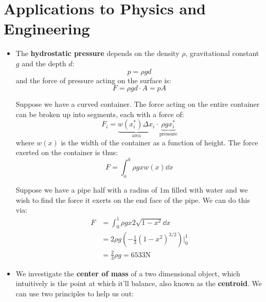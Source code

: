 \section{Applications to Physics and Engineering}
\begin{itemize}
    \item The \textbf{hydrostatic pressure} depends on the density $\rho$, gravitational constant $g$ and the depth $d$:
    \begin{equation}
        p = \rho g d
    \end{equation}
    and the force of pressure acting on the surface is:
    \begin{equation}
        F = \rho g d \cdot A = pA
    \end{equation}
    \begin{figure}[ht]
        \centering
    \end{figure}
    \begin{example}
        Suppose we have a curved container. The force acting on the entire container can be broken up into segments, each with a force of:
        \begin{equation}
            F_i = \underbrace{w(x_i^*)\Delta x_i}_\text{area} \cdot \underbrace{\rho gx_i^*}_\text{pressure}
        \end{equation}
        where $w(x)$ is the width of the container as a function of height. The force exerted on the container is thus:
        \begin{equation}
            F = \int_a^b \rho g x w(x) \dd{x}
        \end{equation}
    \end{example}
    \begin{example}
        Suppose we have a pipe half with a radius of $1\si{\meter}$ filled with water and we wish to find the force it exerts on the end face of the pipe. We can do this via:
        \begin{align}
            F &= \int_0^1 \rho gx 2\sqrt{1-x^2}\dd{x} \\ 
            &= 2\rho g\left(-\frac{1}{3}(1-x^2)^{3/2}\right)\Biggr|^1_0 \\ 
            &= \frac{2}{3}\rho g = 6533 \si{\newton}
        \end{align}
    \end{example}
    \item We investigate the \textbf{center of mass} of a two dimensional object, which intuitively is the point at which it'll balance, also known as the \textbf{centroid}. We can use two principles to help us out:

\end{itemize}
